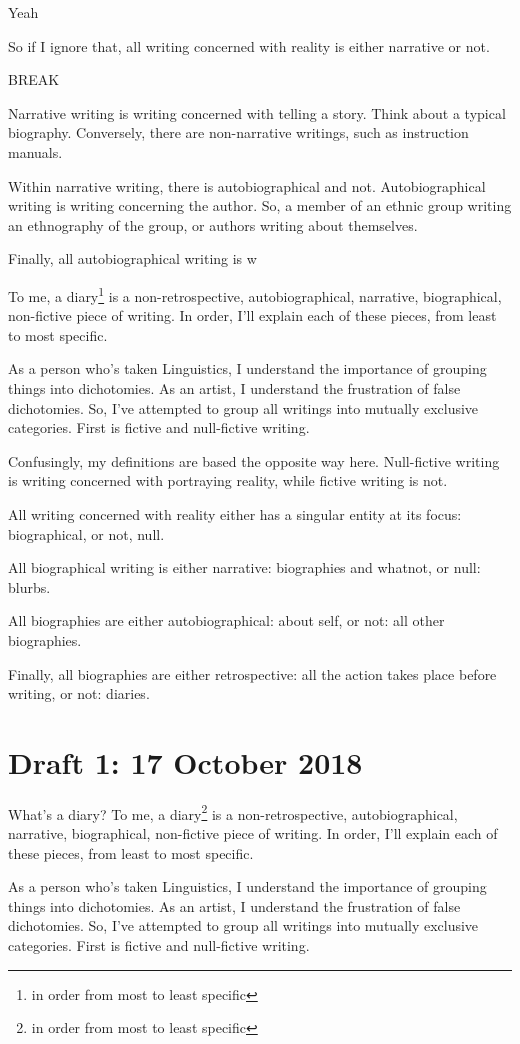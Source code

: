 Yeah \documentclass[12pt]{article}[titlepage]
\newcommand{\1}{\={a}}
\newcommand{\2}{\={e}}
\newcommand{\3}{\={\i}}
\newcommand{\4}{\=o}
\newcommand{\5}{\=u}
\newcommand{\6}{\={A}}
\renewcommand{\,}{\textsuperscript{,}}
\begin{document}
So if I ignore that, all writing concerned with reality is either narrative or not.

BREAK

Narrative writing is writing concerned with telling a story.
Think about a typical biography.
Conversely, there are non-narrative writings, such as instruction manuals.

Within narrative writing, there is autobiographical and not.
Autobiographical writing is writing concerning the author.
So, a member of an ethnic group writing an ethnography of the group, or authors writing about themselves.

Finally, all autobiographical writing is w

To me, a diary\footnote{in order from most to least specific} is a non-retrospective, autobiographical, narrative, biographical, non-fictive piece of writing.
In order, I'll explain each of these pieces, from least to most specific.

As a person who's taken Linguistics, I understand the importance of grouping things into dichotomies.
As an artist, I understand the frustration of false dichotomies.
So, I've attempted to group all writings into mutually exclusive categories.
First is fictive and null-fictive writing.

Confusingly, my definitions are based the opposite way here.
Null-fictive writing is writing concerned with portraying reality, while fictive writing is not.

All writing concerned with reality either has a singular entity at its focus: biographical, or not, null.

All biographical writing is either narrative: biographies and whatnot, or null: blurbs.

All biographies are either autobiographical: about self, or not: all other biographies.

Finally, all biographies are either retrospective: all the action takes place before writing, or not: diaries.

\section{Draft 1: 17 October 2018}
What's a diary?
To me, a diary\footnote{in order from most to least specific} is a non-retrospective, autobiographical, narrative, biographical, non-fictive piece of writing.
In order, I'll explain each of these pieces, from least to most specific.

As a person who's taken Linguistics, I understand the importance of grouping things into dichotomies.
As an artist, I understand the frustration of false dichotomies.
So, I've attempted to group all writings into mutually exclusive categories.
First is fictive and null-fictive writing.
\end{document}
